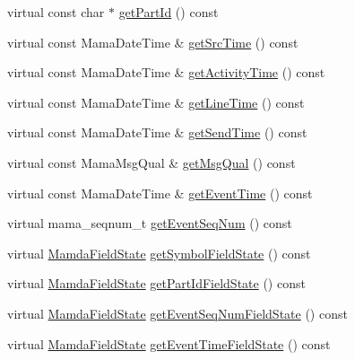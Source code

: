 \begin{CompactItemize}
\item 
virtual const char $\ast$ \hyperlink{classWombat_1_1MamdaOrderBookListener_43689c10340beb6c62cc5b6e9680e44f}{get\-Part\-Id} () const 
\item 
virtual const Mama\-Date\-Time \& \hyperlink{classWombat_1_1MamdaOrderBookListener_44f0107552d26551644736520b00b530}{get\-Src\-Time} () const 
\item 
virtual const Mama\-Date\-Time \& \hyperlink{classWombat_1_1MamdaOrderBookListener_d696de0b8a7d04c239f813163c9f63b9}{get\-Activity\-Time} () const 
\item 
virtual const Mama\-Date\-Time \& \hyperlink{classWombat_1_1MamdaOrderBookListener_5c765d829c1eca59880839fe360b4497}{get\-Line\-Time} () const 
\item 
virtual const Mama\-Date\-Time \& \hyperlink{classWombat_1_1MamdaOrderBookListener_244f7440a5a3f0bb81419cae5718ddd8}{get\-Send\-Time} () const 
\item 
virtual const Mama\-Msg\-Qual \& \hyperlink{classWombat_1_1MamdaOrderBookListener_a1486090a37ac30c038d18a38ae89d72}{get\-Msg\-Qual} () const 
\item 
virtual const Mama\-Date\-Time \& \hyperlink{classWombat_1_1MamdaOrderBookListener_c0272dc0cb65d7b3a55b8216b12acda6}{get\-Event\-Time} () const 
\item 
virtual mama\_\-seqnum\_\-t \hyperlink{classWombat_1_1MamdaOrderBookListener_be0061292ee9bd7ef1d890bd825b1a0d}{get\-Event\-Seq\-Num} () const 
\item 
virtual \hyperlink{namespaceWombat_93aac974f2ab713554fd12a1fa3b7d2a}{Mamda\-Field\-State} \hyperlink{classWombat_1_1MamdaOrderBookListener_ed48775d67d2806a1d78fbf5310f7a5b}{get\-Symbol\-Field\-State} () const 
\item 
virtual \hyperlink{namespaceWombat_93aac974f2ab713554fd12a1fa3b7d2a}{Mamda\-Field\-State} \hyperlink{classWombat_1_1MamdaOrderBookListener_0ebeb44c9a22a8d459b075f0afcd0f69}{get\-Part\-Id\-Field\-State} () const 
\item 
virtual \hyperlink{namespaceWombat_93aac974f2ab713554fd12a1fa3b7d2a}{Mamda\-Field\-State} \hyperlink{classWombat_1_1MamdaOrderBookListener_f48b72f5bed1a318a9487cffaf965d79}{get\-Event\-Seq\-Num\-Field\-State} () const 
\item 
virtual \hyperlink{namespaceWombat_93aac974f2ab713554fd12a1fa3b7d2a}{Mamda\-Field\-State} \hyperlink{classWombat_1_1MamdaOrderBookListener_ff57a8efade5c642a3d871debb2cd056}{get\-Event\-Time\-Field\-State} () const 
\item 

\end{CompactItemize}
